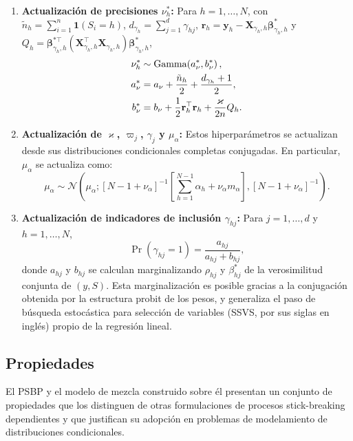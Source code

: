 \begin{enumerate}
    \item \textbf{Actualización de precisiones $\nu_h^*$:} Para
    $h = 1, \dots, N$, con $\tilde{n}_h = \sum_{i=1}^n \mathbf{1}(S_i = h)$,
    $d_{\gamma_h} = \sum_{j=1}^d \gamma_{hj}$,
    $\mathbf{r}_h = \mathbf{y}_h -
    \mathbf{X}_{\gamma_h,h}\boldsymbol{\beta}_{\gamma_h,h}^*$ y
    $Q_h = \boldsymbol{\beta}_{\gamma_h,h}^{*\top}
    (\mathbf{X}_{\gamma_h,h}^\top\mathbf{X}_{\gamma_h,h})
    \boldsymbol{\beta}_{\gamma_h,h}^*$,
    \begin{align}
        \nu_h^* &\sim \mathrm{Gamma}\!\left(a_\nu^*, b_\nu^*\right),
        \notag\\
        a_\nu^* &= a_\nu + \frac{\tilde{n}_h}{2} +
        \frac{d_{\gamma_h}+1}{2}, \notag\\
        b_\nu^* &= b_\nu + \frac{1}{2}\mathbf{r}_h^\top\mathbf{r}_h
        + \frac{\varkappa}{2n}Q_h.
    \end{align}
 
    \item \textbf{Actualización de $\varkappa$, $\varpi_j$, $\gamma_j$ y $\mu_\alpha$:}
    Estos hiperparámetros se actualizan desde sus distribuciones
    condicionales completas conjugadas. En particular, $\mu_\alpha$ se
    actualiza como:
    \begin{equation}
        \mu_\alpha \sim \mathcal{N}\!\left(\mu_\alpha;
        [N - 1 + \nu_\alpha]^{-1}\!
        \left[\sum_{h=1}^{N-1}\alpha_h +
        \nu_\alpha m_\alpha\right],
        [N - 1 + \nu_\alpha]^{-1}\right).
    \end{equation}
 
    \item \textbf{Actualización de indicadores de inclusión
    $\gamma_{hj}$:} Para $j = 1, \dots, d$ y $h = 1, \dots, N$,
    \begin{equation}
        \Pr(\gamma_{hj} = 1) = \frac{a_{hj}}{a_{hj} + b_{hj}},
    \end{equation}
    donde $a_{hj}$ y $b_{hj}$ se calculan marginalizando $\rho_{hj}$
    y $\beta_{hj}^*$ de la verosimilitud conjunta de $(y, S)$. Esta
    marginalización es posible gracias a la conjugación obtenida por
    la estructura probit de los pesos, y generaliza el paso de
    búsqueda estocástica para selección de variables (SSVS, por sus
    siglas en inglés) propio de la regresión lineal.
 
\end{enumerate}
 
 
\subsection{Propiedades}
\label{03_03_03_propiedades}
El PSBP y el modelo de mezcla construido sobre él presentan un conjunto de propiedades que los distinguen de otras formulaciones de procesos stick-breaking dependientes y que justifican su adopción en problemas de modelamiento de distribuciones condicionales.\\
 
